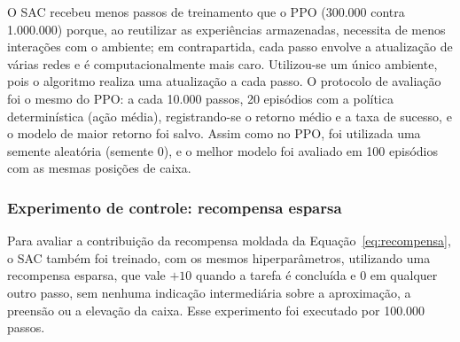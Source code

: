 O SAC recebeu menos passos de treinamento que o PPO (300.000 contra 1.000.000) porque, ao reutilizar as experiências armazenadas, necessita de menos interações com o ambiente; em contrapartida, cada passo envolve a atualização de várias redes e é computacionalmente mais caro. Utilizou-se um único ambiente, pois o algoritmo realiza uma atualização a cada passo. O protocolo de avaliação foi o mesmo do PPO: a cada 10.000 passos, 20 episódios com a política determinística (ação média), registrando-se o retorno médio e a taxa de sucesso, e o modelo de maior retorno foi salvo. Assim como no PPO, foi utilizada uma semente aleatória (semente 0), e o melhor modelo foi avaliado em 100 episódios com as mesmas posições de caixa.

\subsubsection{Experimento de controle: recompensa esparsa}

Para avaliar a contribuição da recompensa moldada da Equação~\ref{eq:recompensa}, o SAC também foi treinado, com os mesmos hiperparâmetros, utilizando uma recompensa esparsa, que vale $+10$ quando a tarefa é concluída e $0$ em qualquer outro passo, sem nenhuma indicação intermediária sobre a aproximação, a preensão ou a elevação da caixa. Esse experimento foi executado por 100.000 passos.
